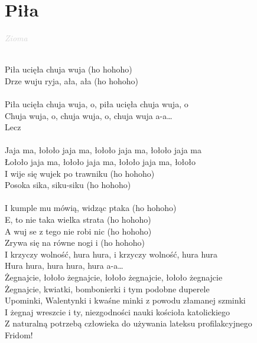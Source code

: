 \documentclass[a5paper, 10pt]{book}
\begin{document}
\section{Piła}\textcolor{lightgray}{\textit{Zioma}}\\~\\
\begin{minipage}[t]{0.85\textwidth}
  Piła ucięła chuja wuja (ho hohoho)\\
  Drze wuju ryja, ała, ała (ho hohoho)\\
  \\
  \hspace*{3mm}Piła ucięła chuja wuja, o, piła ucięła chuja wuja, o\\
  \hspace*{3mm}Chuja wuja, o, chuja wuja, o, chuja wuja a-a…\\
  \hspace*{3mm}Lecz\\
  \\
  \hspace*{6mm}Jaja ma, łołoło jaja ma, łołoło jaja ma, łołoło jaja ma\\
  \hspace*{6mm}Łołoło jaja ma, łołoło jaja ma, łołoło jaja ma, łołoło\\

  I wije się wujek po trawniku (ho hohoho)\\
  Posoka sika, siku-siku (ho hohoho)\\
  \\
  I kumple mu mówią, widząc ptaka (ho hohoho)\\
  E, to nie taka wielka strata (ho hohoho)\\

  A wuj se z tego nie robi nic (ho hohoho)\\
  Zrywa się na równe nogi i (ho hohoho)\\

  \hspace*{3mm}I krzyczy wolność, hura hura, i krzyczy wolność, hura hura\\
  \hspace*{3mm}Hura hura, hura hura, hura a-a…\\

  \hspace*{6mm}Żegnajcie, łołoło żegnajcie, łołoło żegnajcie, łołoło żegnajcie \\
  \hspace*{6mm}Żegnajcie, kwiatki, bombonierki i tym podobne duperele\\
  \hspace*{6mm}Upominki, Walentynki i kwaśne minki z powodu złamanej szminki\\
  \hspace*{6mm}I żegnaj wreszcie i ty, niezgodności nauki kościoła katolickiego\\
  \hspace*{6mm}Z naturalną potrzebą człowieka do używania lateksu profilakcyjnego\\
  \hspace*{6mm}Fridom!\\
\end{minipage}
\end{document}
